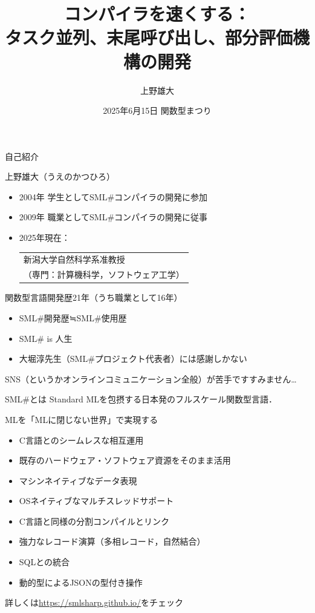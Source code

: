 \documentclass[aspectratio=169,t,dvipdfmx,12pt]{beamer}
\title{\smlsharp{}コンパイラを速くする：\\
タスク並列、末尾呼び出し、部分評価機構の開発}
\author{上野雄大}
\date{2025年6月15日 関数型まつり}
\newcommand\smlsharp{SML\#}
\begin{document}
\maketitle

\begin{frame}{自己紹介}

上野雄大（うえのかつひろ）
\begin{itemize}
\item 2004年 学生として\smlsharp{}コンパイラの開発に参加
\item 2009年 職業として\smlsharp{}コンパイラの開発に従事
\item 2025年現在：\begin{tabular}[t]{@{}l}新潟大学自然科学系准教授\\（専門：計算機科学，ソフトウェア工学）\end{tabular}
\end{itemize}

\bigskip

関数型言語開発歴21年（うち職業として16年）
\begin{itemize}
\item \smlsharp{}開発歴≒\smlsharp{}使用歴
\item \smlsharp{} is 人生
\item 大堀淳先生（\smlsharp{}プロジェクト代表者）には感謝しかない
\end{itemize}

\bigskip

{\footnotesize
SNS（というかオンラインコミュニケーション全般）が苦手ですすみません…}

\end{frame}

\begin{frame}{\smlsharp{}とは}
Standard MLを包摂する日本発のフルスケール関数型言語．

\bigskip

MLを「MLに閉じない世界」で実現する
\begin{itemize}
\item C言語とのシームレスな相互運用
\item 既存のハードウェア・ソフトウェア資源をそのまま活用
\item マシンネイティブなデータ表現
\item OSネイティブなマルチスレッドサポート
\item C言語と同様の分割コンパイルとリンク
\item 強力なレコード演算（多相レコード，自然結合）
\item SQLとの統合
\item 動的型によるJSONの型付き操作
\end{itemize}
\bigskip
詳しくは\url{https://smlsharp.github.io/}をチェック
\end{frame}
\end{document}
